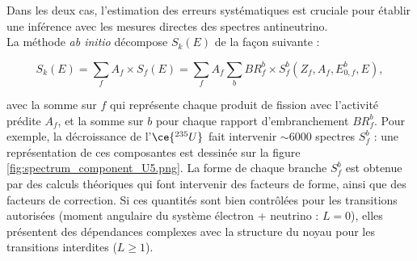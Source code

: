 \bigbreak

Dans les deux cas, l'estimation des erreurs systématiques est cruciale pour établir une inférence avec les mesures directes des spectres antineutrino.\\

La méthode \textit{ab initio} décompose $S_k(E)$ de la façon suivante :

\begin{equation}
    S_k(E) = \sum_{f} A_{f}\times S_{f}(E) = \sum_{f} A_{f} \sum_{b} BR^b_{f} \times S^b_{f}(Z_{f}, A_{f}, E^b_{0, f}, E),
\end{equation}

\bigbreak

avec la somme sur $f$ qui représente chaque produit de fission avec l'activité prédite $A_{f}$, et la somme sur $b$ pour chaque rapport d'embranchement $BR^b_{f}$. Pour exemple, la décroissance de l'$\ce{^{235}U}$ fait intervenir $\sim 6000$ spectres $S^b_{f}$ : une représentation de ces composantes est dessinée sur la figure \ref{fig:spectrum_component_U5.png}. La forme de chaque branche $S^b_{f}$ est obtenue par des calculs théoriques qui font intervenir des facteurs de forme, ainsi que des facteurs de correction. Si ces quantités sont bien contrôlées pour les transitions autorisées (moment angulaire du système électron + neutrino : $L = 0$), elles présentent des dépendances complexes avec la structure du noyau pour les transitions interdites ($L \geq 1$).\\


